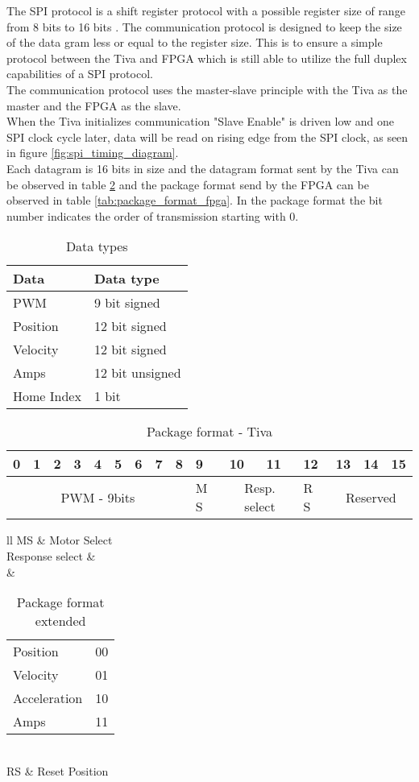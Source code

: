 \documentclass[../../../main]{subfiles}
\begin{document}
The SPI protocol is a shift register protocol with a possible register size of range from 8 bits to 16 bits \cite[sec.15]{tiva_data}.
The communication protocol is designed to keep the size of the data gram less or equal to the register size. This is to ensure a simple protocol between the Tiva and FPGA which is still able to utilize the full duplex capabilities of a SPI protocol. \\
The communication protocol uses the master-slave principle with the Tiva as the master and the FPGA as the slave.\\
When the Tiva initializes communication "Slave Enable" is driven low and one SPI clock cycle later,
data will be read on rising edge from the SPI clock, as seen in figure \ref{fig:spi_timing_diagram}.
\\
Each datagram is 16 bits in size and the datagram format sent by the Tiva
can be observed in table \ref{tab:package_format_tiva} and the package format send by the FPGA
can be observed in table \ref{tab:package_format_fpga}.
In the package format the bit number indicates the order of transmission starting with 0.

\begin{table}[h]
	\centering
	\begin{tabular}{ll}
		\textbf{Data}& \textbf{Data type}  \\
		\hline
		PWM& 9 bit signed \\
		Position& 12 bit signed \\
		Velocity& 12 bit signed \\
		Amps& 12 bit unsigned \\
		Home Index& 1 bit
	\end{tabular}
	\caption{Data types}
	\label{tab:spi_datatypes}
\end{table}
\begin{table}[h]
	\centering
	\begin{tabular}{|*{16}{p{0.50cm}|}}
		\hline
		0&1&2&3&4&5&6&7&8&9&10&11&12&13&14&15\\
		\hline
		\multicolumn{9}{|c|}{PWM  - 9bits} & M S&
		\multicolumn{2}{c|}{Resp. select}& R S&
		\multicolumn{3}{c|}{Reserved}
		\\
		\hline
	\end{tabular}
	\caption{Package format - Tiva}
	\label{tab:package_format_tiva}
\end{table}
\begin{table}[H]
	\centering
	\begin{tabular}{ll}
		MS & Motor Select\\
		\hline
		Response select &\\ &
		\begin{tabular}{ll}
			Position & 00\\
			Velocity & 01\\
			Acceleration & 10\\
			Amps & 11
		\end{tabular}
		\\\hline
		RS & Reset Position
		\\\hline
	\end{tabular}
	\caption{Package format extended}
	\label{tab:shorthand}
\end{table}
\end{document}
